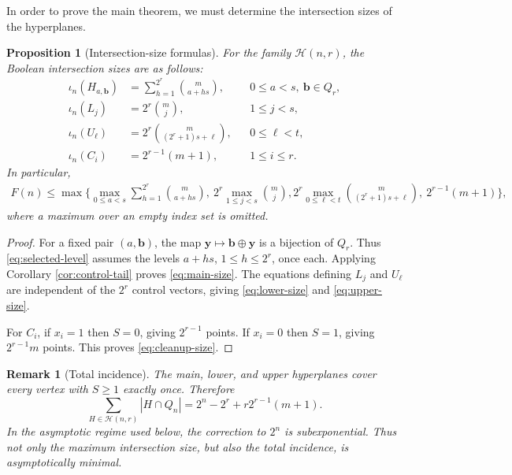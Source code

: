 \documentclass[11pt]{article}
\newtheorem{proposition}[theorem]{Proposition}
\newtheorem{remark}[theorem]{Remark}
\newcommand{\Q}{Q}
\newcommand{\isect}{\iota}
\newcommand{\1}{\mathbf{1}}
\begin{document}
	In order to prove the main theorem, we must determine the intersection sizes of the hyperplanes.
	
	\begin{proposition}[Intersection-size formulas]\label{prop:intersection-formulas}
		For the family $\mathcal H(n,r)$, the Boolean intersection sizes are as follows:
		\begin{align}
			\isect_n(H_{a,\textbf{b}})
			&=\sum_{h=1}^{2^r}\binom{m}{a+hs},
			&&0\le a<s,\ \textbf{b}\in\Q_r,\label{eq:main-size}\\
			\isect_n(L_j)
			&=2^r\binom{m}{j},
			&&1\le j<s,\label{eq:lower-size}\\
			\isect_n(U_\ell)
			&=2^r\binom{m}{(2^r+1)s+\ell},
			&&0\le\ell<t,\label{eq:upper-size}\\
			\isect_n(C_i)
			&=2^{r-1}(m+1),
			&&1\le i\le r.\label{eq:cleanup-size}
		\end{align}
		In particular,
		\begin{multline}\label{eq:general-upper}
			F(n)\le \max\Biggl\{
			\max_{0\le a<s}\sum_{h=1}^{2^r}\binom{m}{a+hs},\ 
			2^r\max_{1\le j<s}\binom{m}{j},
			2^r\max_{0\le\ell<t}\binom{m}{(2^r+1)s+\ell},\ 
			2^{r-1}(m+1)
			\Biggr\},
		\end{multline}
		where a maximum over an empty index set is omitted.
	\end{proposition}
	
	\begin{proof}
		For a fixed pair $(a,\textbf{b})$, the map $\textbf{y}\mapsto \textbf{b}\oplus \textbf{y}$ is a bijection of $\Q_r$. Thus \eqref{eq:selected-level} assumes the levels $a+hs$, $1\le h\le 2^r$, once each. Applying Corollary \ref{cor:control-tail} proves \eqref{eq:main-size}. The equations defining $L_j$ and $U_\ell$ are independent of the $2^r$ control vectors, giving \eqref{eq:lower-size} and \eqref{eq:upper-size}.
		
		For $C_i$, if $x_i=1$ then $S=0$, giving $2^{r-1}$ points. If $x_i=0$ then $S=1$, giving $2^{r-1}m$ points. This proves \eqref{eq:cleanup-size}.
	\end{proof}
	
	\begin{remark}[Total incidence]\label{rem:total-incidence}
		The main, lower, and upper hyperplanes cover every vertex with $S\ge1$ exactly once. Therefore
		\[
		\sum_{H\in\mathcal H(n,r)}|H\cap\Q_n|
		=2^n-2^r+r2^{r-1}(m+1).
		\]
		In the asymptotic regime used below, the correction to $2^n$ is subexponential. Thus not only the maximum intersection size, but also the total incidence, is asymptotically minimal.
	\end{remark}
\end{document}
